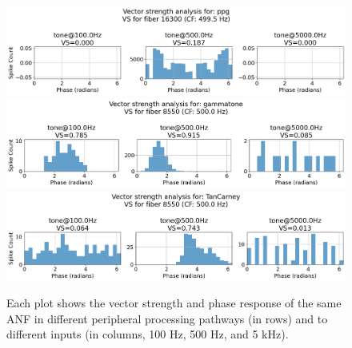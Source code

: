 \documentclass[11pt,a4paper,twocolumn]{article}
\begin{document}
\begin{figure}
    \centering
    \includegraphics[width=1\linewidth]{Images/VSppg.png}
    \includegraphics[width=1\linewidth]{Images/VSgamm.png}
    \includegraphics[width=1\linewidth]{Images/VStancarney.png}
    \caption{Each plot shows the vector strength and phase response of the same ANF in different peripheral processing pathways (in rows) and to different inputs (in columns, 100 Hz, 500 Hz, and 5 kHz).}
    \label{fig:vectorstrength}
\end{figure}
\end{document}
